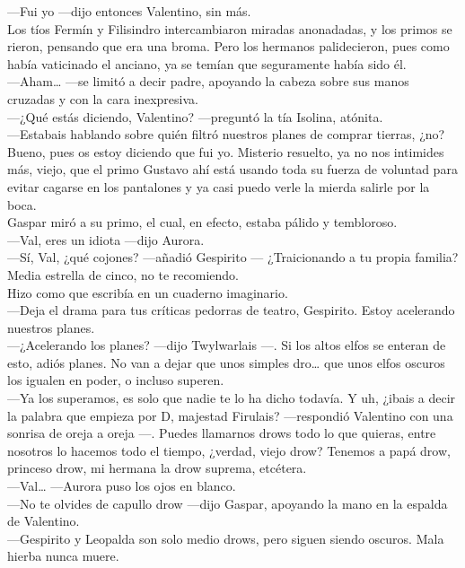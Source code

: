 \documentclass[
  letterpaper,
]{book}
\begin{document}
---Fui yo ---dijo entonces Valentino, sin más.\\
Los tíos Fermín y Filisindro intercambiaron miradas anonadadas, y los
primos se rieron, pensando que era una broma. Pero los hermanos
palidecieron, pues como había vaticinado el anciano, ya se temían que
seguramente había sido él.\\
---Aham\ldots{} ---se limitó a decir padre, apoyando la cabeza sobre sus
manos cruzadas y con la cara inexpresiva.\\
---¿Qué estás diciendo, Valentino? ---preguntó la tía Isolina,
atónita.\\
---Estabais hablando sobre quién filtró nuestros planes de comprar
tierras, ¿no? Bueno, pues os estoy diciendo que fui yo. Misterio
resuelto, ya no nos intimides más, viejo, que el primo Gustavo ahí está
usando toda su fuerza de voluntad para evitar cagarse en los pantalones
y ya casi puedo verle la mierda salirle por la boca.\\
Gaspar miró a su primo, el cual, en efecto, estaba pálido y
tembloroso.\\
---Val, eres un idiota ---dijo Aurora.\\
---Sí, Val, ¿qué cojones? ---añadió Gespirito --- ¿Traicionando a tu
propia familia? Media estrella de cinco, no te recomiendo.\\
Hizo como que escribía en un cuaderno imaginario.\\
---Deja el drama para tus críticas pedorras de teatro, Gespirito. Estoy
acelerando nuestros planes.\\
---¿Acelerando los planes? ---dijo Twylwarlais ---. Si los altos elfos
se enteran de esto, adiós planes. No van a dejar que unos simples
dro\ldots{} que unos elfos oscuros los igualen en poder, o incluso
superen.\\
---Ya los superamos, es solo que nadie te lo ha dicho todavía. Y uh,
¿ibais a decir la palabra que empieza por D, majestad Firulais?
---respondió Valentino con una sonrisa de oreja a oreja ---. Puedes
llamarnos drows todo lo que quieras, entre nosotros lo hacemos todo el
tiempo, ¿verdad, viejo drow? Tenemos a papá drow, princeso drow, mi
hermana la drow suprema, etcétera.\\
---Val\ldots{} ---Aurora puso los ojos en blanco.\\
---No te olvides de capullo drow ---dijo Gaspar, apoyando la mano en la
espalda de Valentino.\\
---Gespirito y Leopalda son solo medio drows, pero siguen siendo
oscuros. Mala hierba nunca muere.\\
\end{document}
